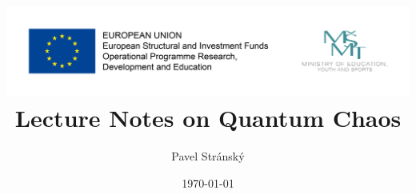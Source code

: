 \documentclass[a4paper,11pt,twoside]{article}
\begin{document}
\theoremstyle{red}
\newtheorem{task}{Task}[section]

\theoremstyle{spaced}
\newtheorem{theorem}{Theorem}[section]

\theoremstyle{spaced}
\newtheorem{definition}{Definition}[section]

\theoremstyle{spaced}
\newtheorem{example}{Example}[section]

\theoremstyle{blue}
\newtheorem{solution}{Solution}[section]

\title{\includegraphics[width=\linewidth]{logolink_OP_VVV_hor_barva_eng.jpg}\\
\vspace{1cm}
Lecture Notes on Quantum Chaos}
\date{\today}
\author{Pavel Stránský}

\maketitle
\tableofcontents

\newpage
\end{document}

